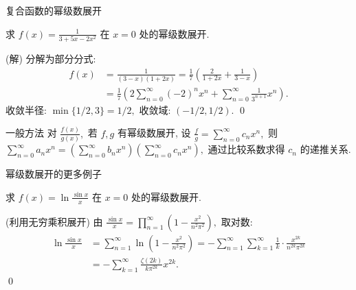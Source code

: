 
\begin{frame}{复合函数的幂级数展开}

\begin{eg}
求 $f(x) = \frac{1}{3+5x-2x^2}$ 在 $x = 0$ 处的幂级数展开.
\end{eg}

\pause

\startproof[bg=yellow, fg=red](解)
分解为部分分式:
\begin{align*}
f(x) & = \frac{1}{(3-x)(1+2x)} = \frac{1}{7} \left( \frac{2}{1+2x} + \frac{1}{3-x} \right) \\
& = \frac{1}{7} \left( 2 \sum_{n=0}^\infty (-2)^n x^n + \sum_{n=0}^\infty \frac{1}{3^{n+1}} x^n \right).
\end{align*}
\pause
收敛半径: $\min\{1/2, 3\} = 1/2,$ 收敛域: $(-1/2, 1/2).$
\qed

\pause

\begin{block}{一般方法}
对 $\frac{f(x)}{g(x)},$ 若 $f, g$ 有幂级数展开, 设 $\frac{f}{g} = \sum_{n=0}^\infty c_n x^n,$ 则 ~ $\sum_{n=0}^\infty a_n x^n = \left(\sum_{n=0}^\infty b_n x^n \right) \left( \sum_{n=0}^\infty c_n x^n \right),$ 通过比较系数求得 $c_n$ 的递推关系.
\end{block}

\end{frame}


\begin{frame}{幂级数展开的更多例子}

\begin{eg}
求 $f(x) = \ln \frac{\sin x}{x}$ 在 $x = 0$ 处的幂级数展开.
\end{eg}

\pause

\startproof[bg=yellow, fg=red](利用无穷乘积展开)
由 $\frac{\sin x}{x} = \prod_{n=1}^\infty \left( 1 - \frac{x^2}{n^2\pi^2} \right),$ 取对数:
\begin{align*}
\ln \frac{\sin x}{x} & = \sum_{n=1}^\infty \ln \left( 1 - \frac{x^2}{n^2\pi^2} \right) = - \sum_{n=1}^\infty \sum_{k=1}^\infty \frac{1}{k} \cdot \frac{x^{2k}}{n^{2k} \pi^{2k}} \\
& = - \sum_{k=1}^\infty \frac{\zeta(2k)}{k \pi^{2k}} x^{2k}.
\end{align*}
\qed

\end{frame}

